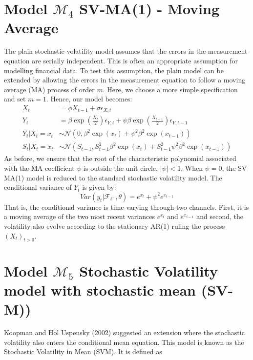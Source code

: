\documentclass[11pt,a4,twosided,singlespacing,titlepagenumber=on]{scrreprt}
\numberwithin{equation}{chapter} %
\theoremstyle{remark}
\begin{document}
\section{Model $\mathcal{M}_4$ SV-MA(1) - Moving Average}
The plain stochastic volatility model assumes that the errors in the measurement equation are serially independent. This is often an appropriate assumption for modelling financial data. To test this assumption, the plain model can be extended by allowing the errors in the measurement equation to follow a moving average (MA) process of order $m$. Here, we choose a more simple specification and set $m = 1$. Hence, our model becomes:
\begin{align*}
X_t									&= \phi X_{t-1} + \sigma \epsilon_{X,t} \\
Y_t									&= \beta \exp \left( \frac{X_t}{2} \right) \epsilon_{Y,t} + \psi \beta \exp \left( \frac{X_{t-1}}{2} \right) \epsilon_{Y,t-1} \\
Y_t	| X_t = x_t						&\sim \mathcal{N} \left(0, \beta^2 \exp \left( x_t \right) + \psi^2 \beta^2 \exp \left( x_{t-1} \right) \right) \\
S_t | X_t = x_t						&\sim \mathcal{N} \left(S_{t-1}, S_{t-1}^2 \beta^2 \exp \left( x_t \right) +  S_{t-1}^2 \psi^2 \beta^2 \exp \left( x_{t-1} \right) \right)
\end{align*}
As before, we ensure that the root of the characteristic polynomial associated with the MA coefficient $\psi$ is outside the unit circle, $|\psi| < 1$. When $\psi = 0$, the SV-MA(1) model is reduced to the standard stochastic volatility model. The conditional
variance of $Y_t$ is given by:
$$Var \left(y_t | \mathcal{F}_{t^-}, \theta \right) = e^{x_t} + \psi^2 e^{x_{t-1}}$$
That is, the conditional variance is time-varying through two channels. First, it is a moving average of the two most recent variances $e^{x_t}$ and $e^{x_{t-1}}$ and second, the volatility also evolve according to the stationary AR(1) ruling the process $(X_t)_{t>0}$.

\section{Model $\mathcal{M}_5$ Stochastic Volatility model with stochastic mean (SV-M))}
Koopman and Hol Uspensky (2002) suggested an extension where the stochastic volatility also enters the conditional mean equation. This model is known as the Stochastic Volatility in Mean (SVM). It is defined as
\end{document}
